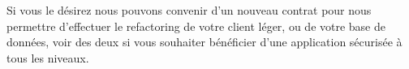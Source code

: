 \documentclass{article}
\begin{document}
Si vous le désirez nous pouvons convenir d’un nouveau contrat pour nous permettre d’effectuer le refactoring de votre client léger, ou de votre base de données, voir des deux si vous souhaiter bénéficier d'une application sécurisée à tous les niveaux.

\renewcommand{\footrulewidth}{0.4pt}
\cfoot{ }
\end{document}
